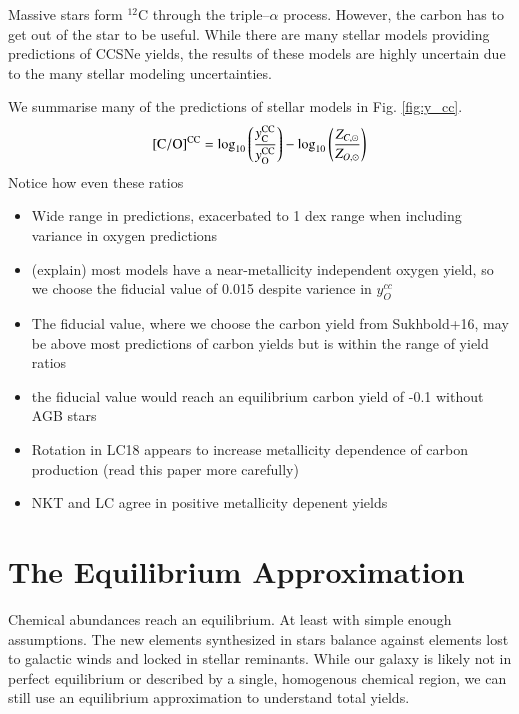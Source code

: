 \documentclass[12pt,oneside]{report}
\newcommand{\sun}{\ensuremath{\odot}}
\begin{document}
Massive stars form $^{12}$C through the triple--$\alpha$ process. However, the carbon has to get out of the star to be useful. 
While there are many stellar models providing predictions of CCSNe yields, the results of these models are highly uncertain due to the many stellar modeling uncertainties. 

We summarise many of the predictions of stellar models in Fig. \ref{fig:y_cc}. 
\begin{equation}\label{eq:c_mg_cc}
    {\rm [C/O]^{CC}} = \log_{10}\left( \frac{y_{\rm C}^{\rm CC}}{y_{\rm O}^{\rm CC}}\right) - \log_{10} \left( \frac{Z_{C, \sun }}{Z_{O, \sun }} \right)
\end{equation}
Notice how even these ratios 



    \begin{itemize}
        \item Wide range in predictions, exacerbated to 1 dex range when including variance in oxygen predictions
        \item (explain) most models have a near-metallicity independent oxygen yield, so we choose the fiducial value of 0.015 despite varience in $y_O^{cc}$
        \item The fiducial value, where we choose the carbon yield from Sukhbold+16, may be above most predictions of carbon yields but is within the range of yield ratios
        \item the fiducial value would reach an equilibrium carbon yield of -0.1 without AGB stars
        \item Rotation in LC18 appears to increase metallicity dependence of carbon production (read this paper more carefully)
        \item NKT and LC agree in positive metallicity depenent yields
    \end{itemize}
    


\chapter{The Equilibrium Approximation}\label{sec:equilibrium}

Chemical abundances reach an equilibrium. At least with simple enough assumptions. The new elements synthesized in stars balance against elements lost to galactic winds and locked in stellar reminants. While our galaxy is likely not in perfect equilibrium or described by a single, homogenous chemical region, we can still use an equilibrium approximation to understand total yields. 
\end{document}
